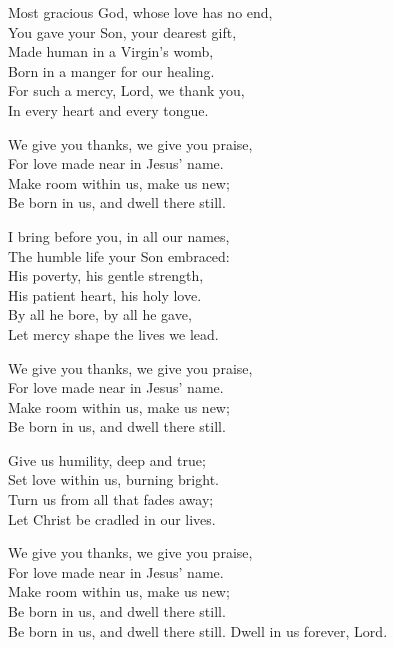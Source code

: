 \begin{lyrics}
Most gracious God, whose love has no end,\\
You gave your Son, your dearest gift,\\
Made human in a Virgin’s womb,\\
Born in a manger for our healing.\\
For such a mercy, Lord, we thank you,\\
In every heart and every tongue.

We give you thanks, we give you praise,\\
For love made near in Jesus’ name.\\
Make room within us, make us new;\\
Be born in us, and dwell there still.

I bring before you, in all our names,\\
The humble life your Son embraced:\\
His poverty, his gentle strength,\\
His patient heart, his holy love.\\
By all he bore, by all he gave,\\
Let mercy shape the lives we lead.

We give you thanks, we give you praise,\\
For love made near in Jesus’ name.\\
Make room within us, make us new;\\
Be born in us, and dwell there still.

Give us humility, deep and true;\\
Set love within us, burning bright.\\
Turn us from all that fades away;\\
Let Christ be cradled in our lives.

We give you thanks, we give you praise,\\
For love made near in Jesus’ name.\\
Make room within us, make us new;\\
Be born in us, and dwell there still.\\
Be born in us, and dwell there still.
Dwell in us forever, Lord.
\end{lyrics}


